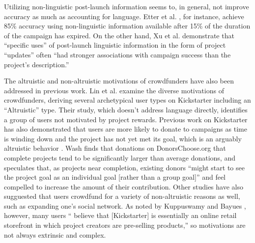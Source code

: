 \documentclass[letterpaper]{article}
\begin{document}
Utilizing non-linguistic post-launch information seems to, in general, not improve accuracy as much as accounting for language. Etter et al. , for instance, achieve 85\% accuracy using non-linguistic information available after 15\% of the duration of the campaign has expired. On the other hand, Xu et al.  demonstrate that ``specific uses'' of post-launch linguistic information in the form of project ``updates'' often ``had stronger associations with campaign success than the project's description.''

The altruistic and non-altruistic motivations of crowdfunders have also been addressed in previous work. Lin et al.  examine the diverse motivations of crowdfunders, deriving several archetypical user types on Kickstarter including an ``Altruistic'' type. Their study, which doesn't address language directly, identifies a group of users not motivated by project rewards. Previous work on Kickstarter has also demonstrated that users are more likely to donate to campaigns as time is winding down and the project has not yet met its goal, which is an arguably altruistic behavior \cite{kuppuswamy2013crowdfunding}. Wash  finds that donations on DonorsChoose.org that complete projects tend to be significantly larger than average donations, and speculates that, as projects near completion, existing donors ``might start to see the project goal as an individual goal [rather than a group goal]'' and feel compelled to increase the amount of their contribution. Other studies have also sugguested that users crowdfund for a variety of non-altruistic reasons as well, such as expanding one's social network\cite{Gerber:2013:CMD:2562181.2530540}. As noted by Kuppuswamy and Bayues , however, many users `` believe that [Kickstarter] is essentially an online retail storefront in which project creators are pre-selling products,'' so motivations are not always extrinsic and complex.
\end{document}
